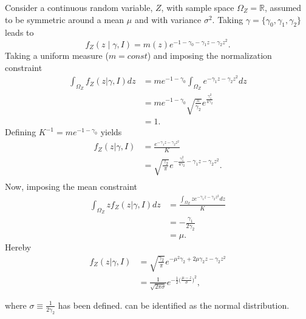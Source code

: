 \begin{example}
	Consider a continuous random variable, $Z$, with sample space $\Omega_Z=\mathbb{R}$, assumed to be symmetric around a mean $\mu$ and with variance $\sigma^2$. Taking $\gamma = \{\gamma_0,\gamma_1,\gamma_2\}$ leads to 
	\begin{equation}
			f_Z(z \mid \gamma, I)= m(z) e^{-1 - \gamma_0 - \gamma_1z-\gamma_2z^2}.
	\end{equation}
	Taking a uniform measure ($m= const$) and imposing the normalization constraint
	\begin{equation}
		\begin{split}
			\int_{\Omega_Z} f_Z(z|\gamma,I) dz &= me^{-1-\gamma_0}\int_{\Omega_Z} e^{-\gamma_1z-\gamma_2z^2} dz\\
			&= me^{-1-\gamma_0}\sqrt{\frac{\pi}{\gamma_2}}e^{\frac{\gamma_1^2}{4\gamma_2}}\\
			&=1.
		\end{split}
	\end{equation}
	Defining $K^{-1} = me^{-1-\gamma_0}$ yields
	\begin{equation}
		\begin{split}
			f_Z(z|\gamma,I) &= \frac{e^{-\gamma_1z-\gamma_2z^2}}{K}\\
			&= \sqrt{\frac{\gamma_2}{\pi}}e^{-\frac{\gamma_1^2}{4\gamma_2}-\gamma_1z-\gamma_2z^2}.\\
		\end{split}
	\end{equation}
	Now, imposing the mean constraint
	\begin{equation}
		\begin{split}
			\int_{\Omega_Z} zf_Z(z|\gamma,I) dz &= \frac{\int_{\Omega_Z} ze^{-\gamma_1z-\gamma_2z^2}dz}{K}\\
			&= -\frac{\gamma_1}{2\gamma_2}\\
			&=\mu.
		\end{split}
	\end{equation}
	Hereby
	\begin{equation}
		\begin{split}
			f_Z(z|\gamma,I) &= \sqrt{\frac{\gamma_2}{\pi}}e^{-\mu^2\gamma_2+2\mu \gamma_2z-\gamma_2z^2}\\
			&= \frac{1}{\sqrt{2\pi\sigma}}e^{-\frac{1}{2}\big(\frac{\mu-z}{\sigma}\big)^2},\\\\
		\end{split}
		\label{eq:norm1}
	\end{equation}
	where $\sigma\equiv \frac{1}{2\gamma_2}$ has been defined.  can be identified as the normal distribution.
\end{example}

